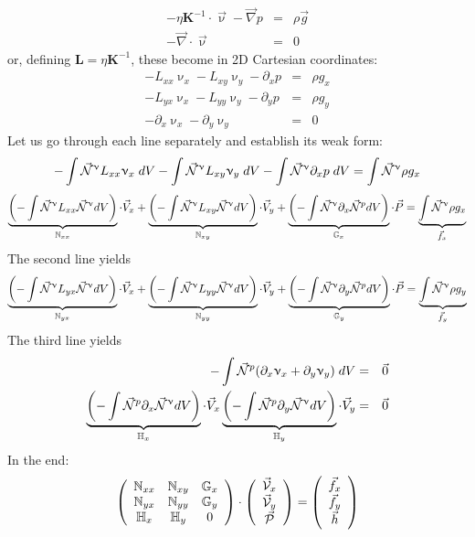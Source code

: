 \begin{eqnarray}
-\eta {\bm K}^{-1} \cdot \vec\upnu - \vec\nabla p &=& \rho \vec{g} \label{eq:darcy4} \\
-\vec\nabla \cdot \vec\upnu &=& 0
\end{eqnarray}
or, defining ${\bm L}=\eta {\bm K}^{-1}$, these become in 2D Cartesian coordinates:
\begin{eqnarray}
-L_{xx}\upnu_x-L_{xy}\upnu_y -\partial_x p &=&\rho g_x \\
-L_{yx}\upnu_x-L_{yy}\upnu_y -\partial_y p &=&\rho g_y \\
-\partial_x \upnu_x - \partial_y \upnu_y &=& 0
\end{eqnarray}
Let us go through each line separately and establish its weak form:
\[
-\int \vec{{\mathcal{N}}}^\upnu L_{xx} \upnu_x \; dV
-\int \vec{{\mathcal{N}}}^\upnu L_{xy} \upnu_y \; dV
-\int \vec{{\mathcal{N}}}^\upnu \partial_x p  \; dV = \int \vec{{\mathcal{N}}}^\upnu \rho g_x \]
\[
\underbrace{\left(-\int \vec{{\mathcal{N}}}^\upnu L_{xx} \vec{{\mathcal{N}}}^\upnu dV\right)}_{{\mathbb{N}}_{xx}} \cdot \vec{V}_x
+
\underbrace{\left(-\int \vec{{\mathcal{N}}}^\upnu L_{xy} \vec{{\mathcal{N}}}^\upnu dV \right)}_{{\mathbb{N}}_{xy}} \cdot
\vec{V}_y
+
\underbrace{\left(-\int \vec{{\mathcal{N}}}^\upnu \partial_x \vec{{\mathcal{N}}}^p dV \right)}_{{\mathbb{G}}_x} \cdot \vec{P} 
= 
\underbrace{\int \vec{{\mathcal{N}}}^\upnu \rho g_x }_{\vec{f}_x}
\]
The second line yields
\[
\underbrace{\left(-\int \vec{{\mathcal{N}}}^\upnu L_{yx} \vec{{\mathcal{N}}}^\upnu dV\right)}_{{\mathbb{N}}_{yx}} \cdot \vec{V}_x
+
\underbrace{\left(-\int \vec{{\mathcal{N}}}^\upnu L_{yy} \vec{{\mathcal{N}}}^\upnu dV \right)}_{{\mathbb{N}}_{yy}} \cdot
\vec{V}_y
+
\underbrace{\left(-\int \vec{{\mathcal{N}}}^\upnu \partial_y \vec{{\mathcal{N}}}^p dV \right)}_{{\mathbb{G}}_y} \cdot \vec{P} 
= 
\underbrace{\int \vec{{\mathcal{N}}}^\upnu \rho g_y }_{\vec{f}_y}
\]
The third line yields
\begin{eqnarray}
-\int \vec{{\mathcal{N}}}^p ( \partial_x \upnu_x + \partial_y \upnu_y) \; dV &=& \vec{0}\\
\underbrace{\left(-\int \vec{{\mathcal{N}}}^p \partial_x \vec{{\mathcal{N}}}^\upnu dV \right)}_{{\mathbb{H}}_x} \cdot \vec{V}_x
\underbrace{\left(-\int \vec{{\mathcal{N}}}^p \partial_y \vec{{\mathcal{N}}}^\upnu dV \right)}_{{\mathbb{H}}_y}\cdot \vec{V}_y &=& \vec{0} 
\end{eqnarray}
In the end:
\[
\left(
\begin{array}{ccc}
{\mathbb{N}}_{xx} & {\mathbb{N}}_{xy} & {\mathbb{G}}_x \\
{\mathbb{N}}_{yx} & {\mathbb{N}}_{yy} & {\mathbb{G}}_y \\
{\mathbb{H}}_{x} & {\mathbb{H}}_y & 0 
\end{array}
\right)
\cdot
\left(
\begin{array}{c}
\vec{\cal V}_x \\
\vec{\cal V}_y \\ 
\vec{\cal P}
\end{array}
\right)
=
\left(
\begin{array}{c}
\vec{f}_x \\ 
\vec{f}_y \\ 
\vec{h}
\end{array}
\right)
\]
